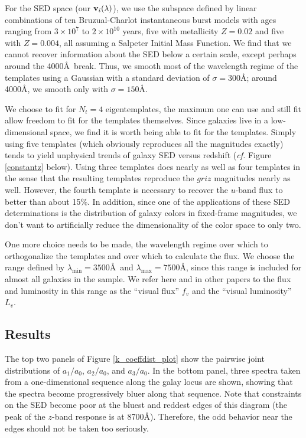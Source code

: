 \documentclass[10pt,preprint]{aastex}
\newcommand{\vv}[1]{{\bf #1}}
\begin{document}
For the SED space (our $\vv{v}_i(\lambda)$), we use the subspace
defined by linear combinations of ten Bruzual-Charlot instantaneous
burst models with ages ranging from $3 \times 10^7$ to $2\times
10^{10}$ years, five with metallicity $Z=0.02$ and five with
$Z=0.004$, all assuming a Salpeter Initial Mass Function. We find that
we cannot recover information about the SED below a certain scale,
except perhaps around the 4000\AA\ break. Thus, we smooth most of the
wavelength regime of the templates using a Gaussian with a standard
deviation of $\sigma = 300$\AA; around 4000\AA, we smooth only with
$\sigma = 150$\AA.

We choose to fit for $N_t = 4$ eigentemplates, the maximum one can use
and still fit allow freedom to fit for the templates themselves. Since
galaxies live in a low-dimensional space, we find it is worth being
able to fit for the templates. Simply using five templates (which
obviously reproduces all the magnitudes exactly) tends to yield
unphysical trends of galaxy SED versus redshift ({\it cf.}  Figure
\ref{constantz} below). Using three templates does nearly as well as
four templates in the sense that the resulting templates reproduce the
$griz$ magnitudes nearly as well. However, the fourth template is
necessary to recover the $u$-band flux to better than about 15\%. In
addition, since one of the applications of these SED determinations is
the distribution of galaxy colors in fixed-frame magnitudes, we don't
want to artificially reduce the dimensionality of the color space to
only two.

One more choice needs to be made, the wavelength regime over which to
orthogonalize the templates and over which to calculate the flux. We
choose the range defined by $\lambda_{\mathrm{min}}=3500$\AA\ and
$\lambda_{\mathrm{max}}=7500$\AA, since this range is included for
almost all galaxies in the sample. We refer here and in other papers
to the flux and luminosity in this range as the ``visual flux'' $f_v$
and the ``visual luminosity'' $L_v$.

\subsection{Results}

The top two panels of Figure \ref{k_coeffdist_plot} show the pairwise
joint distributions of $a_1/a_0$, $a_2/a_0$, and $a_3/a_0$. In the
bottom panel, three spectra taken from a one-dimensional sequence
along the galay locus are shown, showing that the spectra become
progressively bluer along that sequence. Note that constraints on the
SED become poor at the bluest and reddest edges of this diagram (the
peak of the $z$-band response is at 8700\AA). Therefore, the odd
behavior near the edges should not be taken too seriously.
\end{document}
